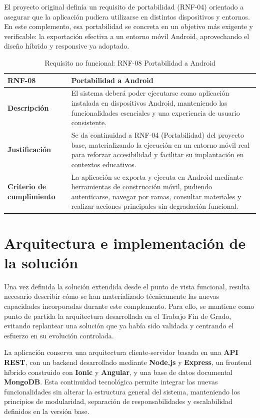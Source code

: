 El proyecto original definía un requisito de portabilidad (RNF-04) orientado a asegurar que la aplicación pudiera utilizarse en distintos dispositivos y entornos. En este complemento, esa portabilidad se concreta en un objetivo más exigente y verificable: la exportación efectiva a un entorno móvil Android, aprovechando el diseño híbrido y responsive \cite{UNIRResponsive} ya adoptado.

\begin{table}[H]
\centering
\begin{tabularx}{\textwidth}{
  |>{\centering\arraybackslash}l
  |>{\centering\arraybackslash}X|}
\hline
\textbf{RNF-08} & \textbf{Portabilidad a Android} \\ \hline
\textbf{Descripción} & El sistema deberá poder ejecutarse como aplicación instalada en dispositivos Android, manteniendo las funcionalidades esenciales y una experiencia de usuario consistente. \\ \hline
\textbf{Justificación} & Se da continuidad a RNF-04 (Portabilidad) del proyecto base, materializando la ejecución en un entorno móvil real para reforzar accesibilidad y facilitar su implantación en contextos educativos. \\ \hline
\textbf{Criterio de cumplimiento} & La aplicación se exporta y ejecuta en Android mediante herramientas de construcción móvil, pudiendo autenticarse, navegar por ramas, consultar materiales y realizar acciones principales sin degradación funcional. \\ \hline
\end{tabularx}
\caption{Requisito no funcional: RNF-08 Portabilidad a Android}
\end{table}

\section{Arquitectura e implementación de la solución}
\label{sec:arquitectura_implementacion}

Una vez definida la solución extendida desde el punto de vista funcional, resulta necesario describir cómo se han materializado técnicamente las nuevas capacidades incorporadas durante este complemento. Para ello, se mantiene como punto de partida la arquitectura desarrollada en el Trabajo Fin de Grado, evitando replantear una solución que ya había sido validada y centrando el esfuerzo en su evolución controlada.

La aplicación conserva una arquitectura cliente-servidor basada en una \textbf{API REST}, con un backend desarrollado mediante \textbf{Node.js} y \textbf{Express}, un frontend híbrido construido con \textbf{Ionic} y \textbf{Angular}, y una base de datos documental \textbf{MongoDB}. Esta continuidad tecnológica permite integrar las nuevas funcionalidades sin alterar la estructura general del sistema, manteniendo los principios de modularidad, separación de responsabilidades y escalabilidad definidos en la versión base.

